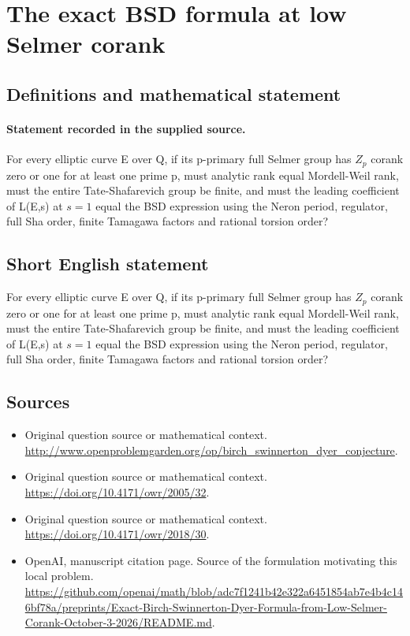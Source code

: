 \documentclass[11pt]{article}
\begin{document}
\section*{The exact BSD formula at low Selmer corank}\label{30007258}
\subsection{Definitions and mathematical statement}
\paragraph{Statement recorded in the supplied source.}
For every elliptic curve E over Q, if its p-primary full Selmer group has $Z_p$ corank zero or one for at least one prime p, must analytic rank equal Mordell-Weil rank, must the entire Tate-Shafarevich group be finite, and must the leading coefficient of L(E,s) at $s=1$ equal the BSD expression using the Neron period, regulator, full Sha order, finite Tamagawa factors and rational torsion order?
\subsection{Short English statement}
For every elliptic curve E over Q, if its p-primary full Selmer group has $Z_p$ corank zero or one for at least one prime p, must analytic rank equal Mordell-Weil rank, must the entire Tate-Shafarevich group be finite, and must the leading coefficient of L(E,s) at $s=1$ equal the BSD expression using the Neron period, regulator, full Sha order, finite Tamagawa factors and rational torsion order?
\subsection{Sources}
\begin{itemize}
\item[S1] Original question source or mathematical context.
\url{http://www.openproblemgarden.org/op/birch_swinnerton_dyer_conjecture}.
\item[S2] Original question source or mathematical context.
\url{https://doi.org/10.4171/owr/2005/32}.
\item[S3] Original question source or mathematical context.
\url{https://doi.org/10.4171/owr/2018/30}.
\item[S4] OpenAI, manuscript citation page. Source of the formulation motivating this local problem.
\url{https://github.com/openai/math/blob/adc7f1241b42e322a6451854ab7e4b4c146bf78a/preprints/Exact-Birch-Swinnerton-Dyer-Formula-from-Low-Selmer-Corank-October-3-2026/README.md}.
\end{itemize}
\end{document}
